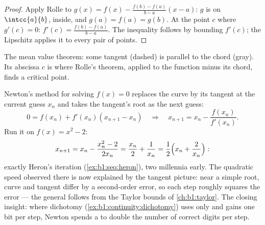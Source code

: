 \begin{proof}
Apply Rolle to $g(x) = f(x) - \frac{f(b) - f(a)}{b - a}(x - a)$: $g$
is  on $\intcc{a}{b}$,  inside, and $g(a) =
f(a) = g(b)$. At the point $c$ where $g'(c) = 0$: $f'(c) =
\frac{f(b)-f(a)}{b-a}$. The inequality follows by bounding $f'(c)$;
the Lipschitz  applies it to every pair of points.
\end{proof}

\begin{omfigure}

{\small The mean value theorem: some tangent (dashed) is parallel to
the chord (gray). Its abscissa $c$ is where Rolle's theorem, applied
to the function minus its chord, finds a critical point.}
\end{omfigure}

\begin{example}\label{ex:b1:derivative:newton}
Newton's method for solving $f(x) = 0$ replaces the curve by
its tangent at the current guess $x_n$ and takes the tangent's
root as the next guess:
\[
0 = f(x_n) + f'(x_n)(x_{n+1} - x_n)
\quad\Longrightarrow\quad
x_{n+1} = x_n - \frac{f(x_n)}{f'(x_n)} .
\]
Run it on $f(x) = x^2 - 2$:
\[
x_{n+1} = x_n - \frac{x_n^2 - 2}{2x_n}
= \frac{x_n}{2} + \frac{1}{x_n}
= \frac12\Bigl(x_n + \frac{2}{x_n}\Bigr) :
\]
exactly Heron's iteration (\cref{ex:b1:seq:heron}), two
millennia early. The quadratic speed observed there is now
explained by the tangent picture: near a simple root, curve and
tangent differ by a second-order error, so each step roughly
squares the error --- the general  follows from the
Taylor bounds of \cref{ch:b1:taylor}. The closing insight:
where dichotomy (\cref{ex:b1:continuity:dichotomy}) uses only
 and gains one bit per step, Newton spends a
 to double the number of correct digits per step.
\end{example}

